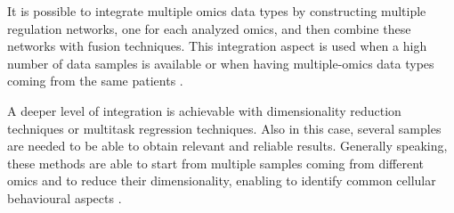 It is possible to integrate multiple omics data types by constructing multiple regulation networks, one for each analyzed omics, and then combine these networks with fusion techniques.
This integration aspect is used when a high number of data samples is available or when having multiple-omics data types coming from the same patients \cite{Wang2014}.

A deeper level of integration is achievable with dimensionality reduction techniques or multitask regression techniques.
Also in this case, several samples are needed to be able to obtain relevant and reliable results.
Generally speaking, these methods are able to start from multiple samples coming from different omics and to reduce their dimensionality, enabling to identify common cellular behavioural aspects \cite{Rohart2017, Argelaguet2018}.



